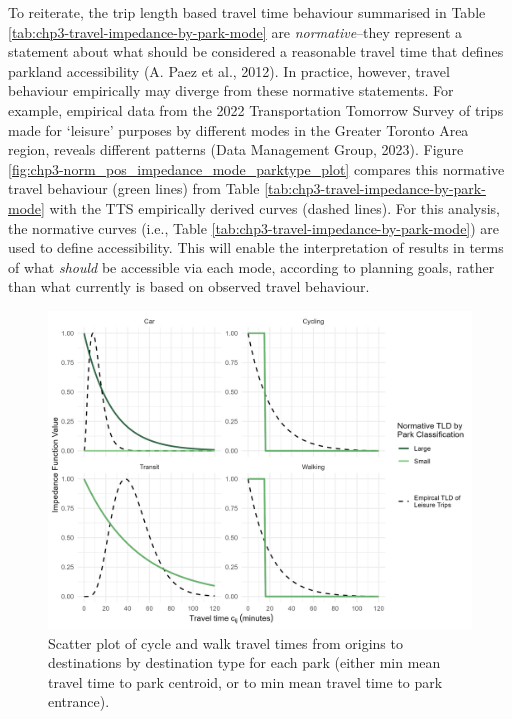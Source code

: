 \documentclass[
11pt, %
oneside, %
english, %
singlespacing, %
]{macthesis} %
\begin{document}
To reiterate, the trip length based travel time behaviour summarised in Table \ref{tab:chp3-travel-impedance-by-park-mode} are \emph{normative}--they represent a statement about what should be considered a reasonable travel time that defines parkland accessibility (A. Paez et al., 2012). In practice, however, travel behaviour empirically may diverge from these normative statements. For example, empirical data from the 2022 Transportation Tomorrow Survey of trips made for `leisure' purposes by different modes in the Greater Toronto Area region, reveals different patterns (Data Management Group, 2023). Figure \ref{fig:chp3-norm_pos_impedance_mode_parktype_plot} compares this normative travel behaviour (green lines) from Table \ref{tab:chp3-travel-impedance-by-park-mode} with the TTS empirically derived curves (dashed lines). For this analysis, the normative curves (i.e., Table \ref{tab:chp3-travel-impedance-by-park-mode}) are used to define accessibility. This will enable the interpretation of results in terms of what \emph{should} be accessible via each mode, according to planning goals, rather than what currently is based on observed travel behaviour.

\begin{figure}

{\centering \includegraphics[width=6in]{./data/figures/chp3-norm_pos_impedance_mode_parktype_plot} 

}

\caption{\label{fig:chp3-norm_pos_impedance_mode_parktype_plot}  Scatter plot of cycle and walk travel times from origins to destinations by destination type for each park (either min mean travel time to park centroid, or to min mean travel time to park entrance). }\label{fig:unnamed-chunk-51}
\end{figure}
\end{document}
